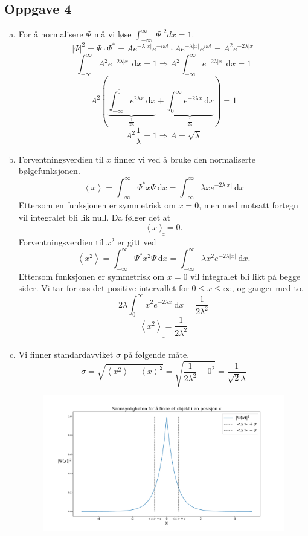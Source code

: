 \documentclass{article}
\begin{document}
\subsection*{Oppgave 4}
\begin{enumerate}[a)]
    \item For å normalisere $Ψ$ må vi løse $\int_{-\infty}^{\infty} \left|Ψ\right|^2 dx = 1$. 
    \[
    \left|Ψ\right|^2 = Ψ ⋅  Ψ^{*} = Ae^{-λ \left|x\right| }e^{-iωt} ⋅ Ae^{-λ \left|x\right| }e^{iωt} = A^2e^{-2λ \left|x\right| }
    \]
    \[
    ∫_{-∞}^{∞} A^2e^{-2λ\left|x\right|} \ \mathrm{d}x = 1 ⇒ A^2 ∫_{-∞}^{∞} e^{-2λ\left|x\right|} \ \mathrm{d}x = 1
    \]
    \[
    A^2 \left(\underbrace{∫_{-∞}^{0} e^{2λx} \ \mathrm{d}x}_{\frac{1}{2λ}} + \underbrace{∫_{0}^{∞} e^{-2λx}\ \mathrm{d}x}_{\frac{1}{2λ}} \right) = 1
    \]
    \[
    A^2 \frac{1}{λ} = 1 ⇒ A = \sqrt{λ}
    \]
    \item Forventningsverdien til $x$ finner vi ved å bruke den normaliserte bølgefunksjonen.
    \[
    \left<x\right> = ∫_{-∞}^{∞} Ψ^{*}xΨ \ \mathrm{d}x = \int_{-\infty}^{\infty} λxe^{-2λ\left|x\right|} \ \mathrm{d}x
    \]
    Ettersom en funksjonen er symmetrisk om $x = 0$, men med motsatt fortegn vil integralet bli lik null. Da følger det at 
    \[
    \underline{\underline{\left<x\right> = 0.}}
    \]
    Forventningsverdien til $x^2$ er gitt ved 
    \[
    \left<x^2\right> = ∫_{-∞}^{∞} Ψ^{*}x^2Ψ \ \mathrm{d}x = \int_{-\infty}^{\infty} λx^2e^{-2λ\left|x\right|} \ \mathrm{d}x. 
    \]
    Ettersom funksjonen er symmetrisk om $x=0$ vil integralet bli likt på begge sider. Vi tar for oss det positive intervallet for $0\le x\le ∞$, og ganger med to. 
    \[
    2λ∫_{0}^{∞} x^2e^{-2λx} \ \mathrm{d}x = \frac{1}{2λ^2}
    \]
    \[
    \underline{\underline{\left<x^2\right> = \frac{1}{2λ^2}}}
    \]
    \item Vi finner standardavviket $σ$ på følgende måte.
    \[
    σ = \sqrt{\left<x^2\right> - \left<x\right>^2} = \sqrt{\frac{1}{2λ^2} - 0^2} = \frac{1}{\sqrt{2}λ}
    \]
    \begin{figure}[h!]
      \centering
      \includegraphics[width = \textwidth]{4.c.pdf}

\end{figure}
\end{enumerate}
\end{document}
